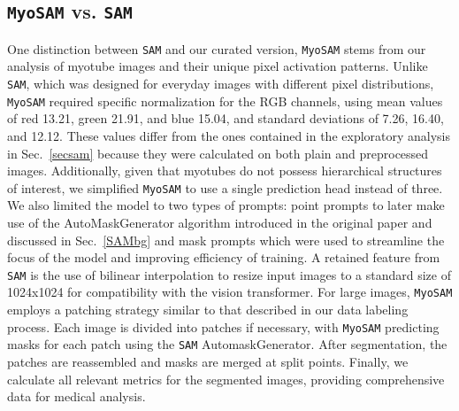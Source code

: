 \subsection{\texttt{MyoSAM} vs. \texttt{SAM}}
One distinction between \texttt{SAM} and our curated version, \texttt{MyoSAM} stems from our analysis of myotube images and their unique pixel activation patterns. Unlike \texttt{SAM}, which was designed for everyday images with different pixel distributions, \texttt{MyoSAM} required specific normalization for the RGB channels, using mean values of red 13.21, green 21.91, and blue 15.04, and standard deviations of 7.26, 16.40, and 12.12. These values differ from the ones contained in the exploratory analysis in Sec.~\ref{secsam} because they were calculated on both plain and preprocessed images. Additionally, given that myotubes do not possess hierarchical structures of interest, we simplified \texttt{MyoSAM} to use a single prediction head instead of three. We also limited the model to two types of prompts: point prompts to later make use of the AutoMaskGenerator algorithm introduced in the original paper and discussed in Sec.~\ref{SAMbg} and mask prompts which were used to streamline the focus of the model and improving efficiency of training.
A retained feature from \texttt{SAM} is the use of bilinear interpolation to resize input images to a standard size of 1024x1024 for compatibility with the vision transformer. For large images, \texttt{MyoSAM} employs a patching strategy similar to that described in our data labeling process. Each image is divided into patches if necessary, with \texttt{MyoSAM} predicting masks for each patch using the \texttt{SAM} AutomaskGenerator. After segmentation, the patches are reassembled and masks are merged at split points. Finally, we calculate all relevant metrics for the segmented images, providing comprehensive data for medical analysis.

